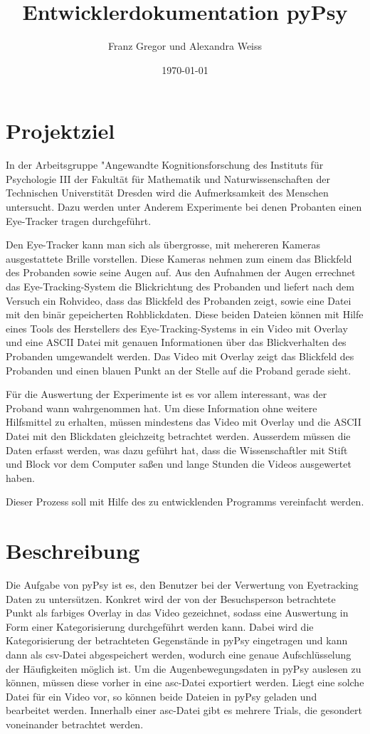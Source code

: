 \documentclass[a4paper,draft]{scrartcl}
\title{Entwicklerdokumentation pyPsy}
\author{Franz Gregor und Alexandra Weiss}
\date{\today}
\begin{document}
\maketitle
\newpage
\tableofcontents
\newpage
\section{Projektziel}
In der Arbeitsgruppe "Angewandte Kognitionsforschung des Instituts f\"ur Psychologie III der Fakult\"at f\"ur Mathematik und Naturwissenschaften der Technischen Universtit\"at Dresden wird die Aufmerksamkeit des Menschen untersucht.
Dazu werden unter Anderem Experimente bei denen Probanten einen Eye-Tracker tragen durchgef\"uhrt.

Den Eye-Tracker kann man sich als \"ubergrosse, mit mehereren Kameras ausgestattete Brille vorstellen.
Diese Kameras nehmen zum einem das Blickfeld des Probanden sowie seine Augen auf.
Aus den Aufnahmen der Augen errechnet das Eye-Tracking-System die Blickrichtung des Probanden und liefert nach dem Versuch ein Rohvideo, dass das Blickfeld des Probanden zeigt, sowie eine Datei mit den bin\"ar gepeicherten Rohblickdaten.
Diese beiden Dateien k\"onnen mit Hilfe eines Tools des Herstellers des Eye-Tracking-Systems in ein Video mit Overlay und eine ASCII Datei mit genauen Informationen \"uber das Blickverhalten des Probanden umgewandelt werden.
Das Video mit Overlay zeigt das Blickfeld des Probanden und einen blauen Punkt an der Stelle auf die Proband gerade sieht.

F\"ur die Auswertung der Experimente ist es vor allem interessant, was der Proband wann wahrgenommen hat.
Um diese Information ohne weitere Hilfsmittel zu erhalten, m\"ussen mindestens das Video mit Overlay und die ASCII Datei mit den Blickdaten gleichzeitg betrachtet werden.
Ausserdem m\"ussen die Daten erfasst werden, was dazu gef\"uhrt hat, dass die Wissenschaftler mit Stift und Block vor dem Computer sa\ss en und lange Stunden die Videos ausgewertet haben.

Dieser Prozess soll mit Hilfe des zu entwicklenden Programms vereinfacht werden.

\section{Beschreibung}
Die Aufgabe von pyPsy ist es, den Benutzer bei der Verwertung von Eyetracking Daten zu untersützen. Konkret wird der von der Besuchsperson betrachtete Punkt als farbiges Overlay in das Video gezeichnet, sodass eine Auswertung in Form einer Kategorisierung durchgeführt werden kann. Dabei wird die Kategorisierung der betrachteten Gegenstände in pyPsy eingetragen und kann dann als csv-Datei abgespeichert werden, wodurch eine genaue Aufschlüsselung der Häufigkeiten möglich ist. 
Um die Augenbewegungsdaten in pyPsy auslesen zu können, müssen diese vorher in eine asc-Datei exportiert werden. Liegt eine solche Datei für ein Video vor, so können beide Dateien in pyPsy geladen und bearbeitet werden.
Innerhalb einer asc-Datei gibt es mehrere Trials, die gesondert voneinander betrachtet werden.
\end{document}
